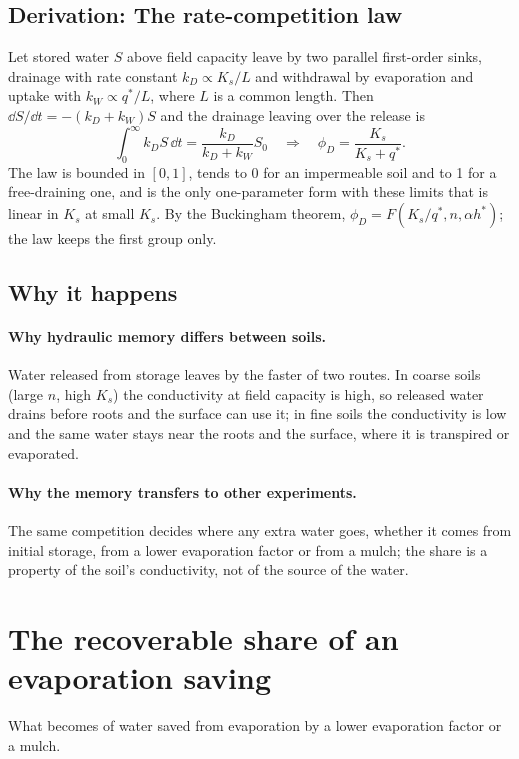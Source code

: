 \subsection{Derivation: The rate-competition law}\label{der:s1:5}
Let stored water $S$ above field capacity leave by two parallel first-order sinks, drainage with rate constant $k_D\propto K_s/L$ and withdrawal by evaporation and uptake with $k_W\propto q^\ast/L$, where $L$ is a common length. Then $\dd S/\dd t=-(k_D+k_W)S$ and the drainage leaving over the release is
\begin{equation}\int_0^\infty k_DS\,\dd t=\frac{k_D}{k_D+k_W}S_0\quad\Longrightarrow\quad\phi_D=\frac{K_s}{K_s+q^\ast}.\end{equation}
The law is bounded in $[0,1]$, tends to 0 for an impermeable soil and to 1 for a free-draining one, and is the only one-parameter form with these limits that is linear in $K_s$ at small $K_s$. By the Buckingham theorem, $\phi_D=F(K_s/q^\ast,n,\alpha h^\ast)$; the law keeps the first group only.


\subsection{Why it happens}
\paragraph{Why hydraulic memory differs between soils.} Water released from storage leaves by the faster of two routes. In coarse soils (large $n$, high $K_s$) the conductivity at field capacity is high, so released water drains before roots and the surface can use it; in fine soils the conductivity is low and the same water stays near the roots and the surface, where it is transpired or evaporated.

\paragraph{Why the memory transfers to other experiments.} The same competition decides where any extra water goes, whether it comes from initial storage, from a lower evaporation factor or from a mulch; the share is a property of the soil's conductivity, not of the source of the water.

\section{The recoverable share of an evaporation saving}
What becomes of water saved from evaporation by a lower evaporation factor or a mulch.

